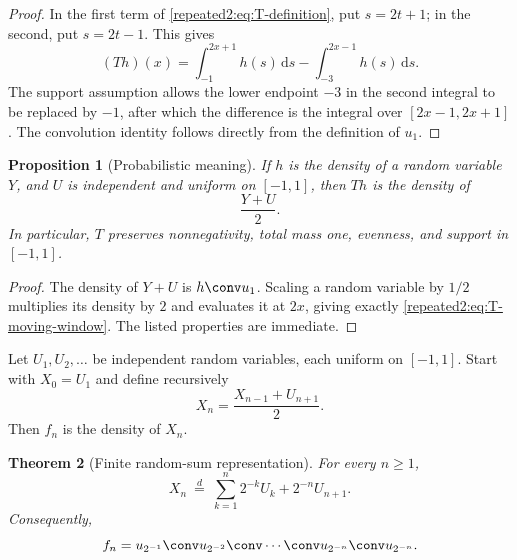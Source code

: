 \documentclass[11pt,oneside]{article}
\newtheorem{theorem}{Theorem}[section]
\newtheorem{proposition}[theorem]{Proposition}
\theoremstyle{definition}
\theoremstyle{remark}
\newcommand{\dd}{\,\mathrm d}
\begin{document}
\begin{proof}
In the first term of \eqref{repeated2:eq:T-definition}, put $s=2t+1$; in the second, put
$s=2t-1$.  This gives
\[
 (Th)(x)=\int_{-1}^{2x+1}h(s)\dd s-\int_{-3}^{2x-1}h(s)\dd s.
\]
The support assumption allows the lower endpoint $-3$ in the second integral to be
replaced by $-1$, after which the difference is the integral over $[2x-1,2x+1]$.
The convolution identity follows directly from the definition of $u_1$.
\end{proof}

\begin{proposition}[Probabilistic meaning]
\label{repeated2:prop:T-probability}
If $h$ is the density of a random variable $Y$, and $U$ is independent and uniform on
$[-1,1]$, then $Th$ is the density of
\begin{equation}
 \frac{Y+U}{2}.
 \label{repeated2:eq:T-random-map}
\end{equation}
In particular, $T$ preserves nonnegativity, total mass one, evenness, and support in
$[-1,1]$.
\end{proposition}

\begin{proof}
The density of $Y+U$ is $h\conv u_1$.  Scaling a random variable by $1/2$ multiplies its
density by $2$ and evaluates it at $2x$, giving exactly \eqref{repeated2:eq:T-moving-window}.
The listed properties are immediate.
\end{proof}

Let $U_1,U_2,\ldots$ be independent random variables, each uniform on $[-1,1]$.
Start with $X_0=U_1$ and define recursively
\begin{equation}
 X_n=\frac{X_{n-1}+U_{n+1}}{2}.
 \label{repeated2:eq:X-recursion}
\end{equation}
Then $f_n$ is the density of $X_n$.

\begin{theorem}[Finite random-sum representation]
\label{repeated2:thm:finite-random-sum}
For every $n\ge1$,
\begin{equation}
 X_n\ \stackrel{d}{=}\
 \sum_{k=1}^{n}2^{-k}U_k+2^{-n}U_{n+1}.
 \label{repeated2:eq:Xn-random-sum}
\end{equation}
Consequently,
\begin{equation}
 f_n=u_{2^{-1}}\conv u_{2^{-2}}\conv\cdots\conv
 u_{2^{-n}}\conv u_{2^{-n}}.
 \label{repeated2:eq:fn-box-convolution}
\end{equation}
\end{theorem}
\end{document}

